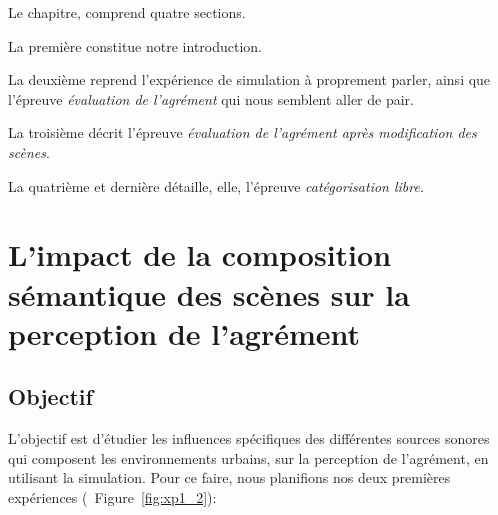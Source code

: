 Le chapitre, comprend quatre sections.

La première constitue notre introduction.

La deuxième reprend l'expérience de simulation à proprement parler, ainsi que l'épreuve \emph{évaluation de l'agrément} qui nous semblent aller de pair.

La troisième décrit l'épreuve \emph{évaluation de l'agrément après modification des scènes}.

La quatrième et dernière détaille, elle, l'épreuve \emph{catégorisation libre}.
 
 
\section[Agrément perçu et composition sémantique]{L'impact de la composition sémantique des scènes sur la perception de l'agrément}
\label{sec:xp1_2}

\subsection{Objectif}

L'objectif est d'étudier les influences spécifiques des différentes sources sonores qui composent les environnements urbains, sur la perception de l'agrément, en utilisant la simulation. Pour ce faire, nous planifions nos deux premières expériences (\cf~Figure~\ref{fig:xp1_2}):

